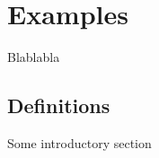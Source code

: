 \chapter{Examples}
\label{chapt:Examples}
Blablabla

\section{Definitions}
Some introductory section